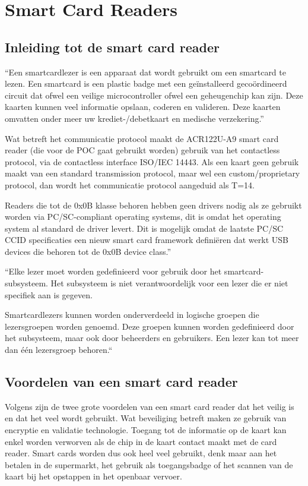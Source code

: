 \section{Smart Card Readers}
\subsection{Inleiding tot de smart card reader}
``Een smartcardlezer is een apparaat dat wordt gebruikt om een smartcard te lezen. Een smartcard is een plastic badge met een geïnstalleerd gecoördineerd circuit dat ofwel een veilige microcontroller ofwel een geheugenchip kan zijn. Deze kaarten kunnen veel informatie opslaan, coderen en valideren. Deze kaarten omvatten onder meer uw krediet-/debetkaart en medische verzekering.''

Wat betreft het communicatie protocol maakt de ACR122U-A9 smart card reader (die voor de POC gaat gebruikt worden) gebruik van het contactless protocol, via de contactless interface ISO/IEC 14443. Als een kaart geen gebruik maakt van een standard transmission protocol, maar wel een custom/proprietary protocol, dan wordt het communicatie protocol aangeduid als T=14.

Readers die tot de 0x0B klasse behoren hebben geen drivers nodig als ze gebruikt worden via PC/SC-compliant operating systems, dit is omdat het operating system al standard de driver levert. Dit is mogelijk omdat de laatste PC/SC CCID specificaties een nieuw smart card framework definiëren dat werkt USB devices die behoren tot de 0x0B device class.''\autocite{OnyaitOdekeCardReader}


``Elke lezer moet worden gedefinieerd voor gebruik door het smartcard-subsysteem. Het subsysteem is niet verantwoordelijk voor een lezer die er niet specifiek aan is gegeven.

Smartcardlezers kunnen worden onderverdeeld in logische groepen die lezersgroepen worden genoemd. Deze groepen kunnen worden gedefinieerd door het subsysteem, maar ook door beheerders en gebruikers. Een lezer kan tot meer dan één lezersgroep behoren.``\autocite{MicrosoftSmartCardReaders}

\subsection{Voordelen van een smart card reader}
Volgens \textcite{OnyaitOdekeCardReader} zijn de twee grote voordelen van een smart card reader dat het veilig is en dat het veel wordt gebruikt. Wat beveiliging betreft maken ze gebruik van encryptie en validatie technologie. Toegang tot de informatie op de kaart kan enkel worden verworven als de chip in de kaart contact maakt met de card reader. Smart cards worden dus ook heel veel gebruikt, denk maar aan het betalen in de supermarkt, het gebruik als toegangsbadge of het scannen van de kaart bij het opstappen in het openbaar vervoer.

